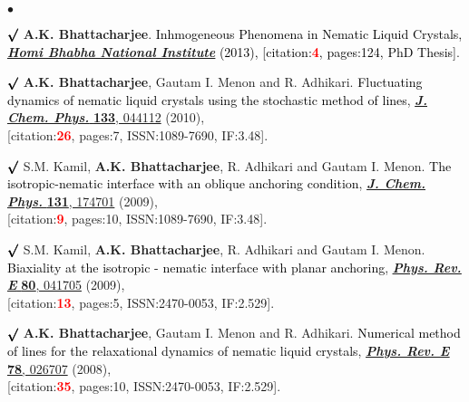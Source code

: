\documentclass[margin,line]{res}
\newenvironment{list2}{
  \begin{list}{$\bullet$}{%
      \setlength{\itemsep}{0in}
      \setlength{\parsep}{0in} \setlength{\parskip}{0in}
      \setlength{\topsep}{0in} \setlength{\partopsep}{0in} 
      \setlength{\leftmargin}{0.2in}}}{\end{list}}
\begin{document}
\begin{resume}
\begin{list2}
\vspace{4mm}
\item[$\pmb\surd$] {\bf A.K. Bhattacharjee}. \textcolor{black}{\textsf{Inhmogeneous Phenomena in Nematic Liquid Crystals},\\ 
\href{http://www.hbni.ac.in/students/dsp_ths.html?nm=phys/PHYS10200604009.pdf}{\underline{\textbf{\textit{Homi Bhabha National Institute}}}} (2013), {[citation:\textcolor{red}{\bf 4}, pages:124, PhD Thesis]}}. 
\vspace{4mm}
\item[$\pmb\surd$] {\bf A.K. Bhattacharjee}, Gautam I. Menon and R. Adhikari. \textcolor{black}{\textsf{Fluctuating dynamics of 
nematic liquid crystals using the stochastic method of lines}}, \href{https://aip.scitation.org/doi/abs/10.1063/1.3455206}{\underline{\textit{\textbf{J. Chem. Phys.}}} {\bf 133}, 044112} (2010), \\{[citation:\textcolor{red}{\bf 26}, pages:7, ISSN:1089-7690, IF:3.48]}.
\vspace{4mm}
\item[$\pmb\surd$] S.M. Kamil, {\bf A.K. Bhattacharjee}, R. Adhikari and Gautam I. Menon. \textcolor{black}{\textsf{The isotropic-nematic 
interface with an oblique anchoring condition}}, \href{https://aip.scitation.org/doi/abs/10.1063/1.3253702}{\underline{\textit{\textbf{J. Chem. Phys.}}} 
{\bf 131}, 174701} (2009), \\{[citation:\textcolor{red}{\bf 9}, pages:10, ISSN:1089-7690, IF:3.48]}. 
\vspace{4mm}
\item[$\pmb\surd$] S.M. Kamil, {\bf A.K. Bhattacharjee}, R. Adhikari and Gautam I. Menon. \textcolor{black}{\textsf{Biaxiality at the 
isotropic - nematic interface with planar anchoring}}, \href{http://pre.aps.org/abstract/PRE/v80/i4/e041705}{\underline{\textit{\textbf{ Phys. Rev. E} }}
{\bf 80}, 041705} (2009), \\{[citation:\textcolor{red}{\bf 13}, pages:5, ISSN:2470-0053, IF:2.529]}.
\vspace{4mm}
\item[$\pmb\surd$] {\bf A.K. Bhattacharjee}, Gautam I. Menon and R. Adhikari. \textcolor{black}{\textsf{Numerical method of lines for 
the relaxational dynamics of nematic liquid crystals}}, \href{http://pre.aps.org/abstract/PRE/v78/i2/e026707}{\underline{\textit{\textbf{Phys. Rev. E}}}
{\bf 78}, 026707} (2008), \\{[citation:\textcolor{red}{\bf 35}, pages:10, ISSN:2470-0053, IF:2.529]}.
\end{list2}

\end{resume}
\end{document}
